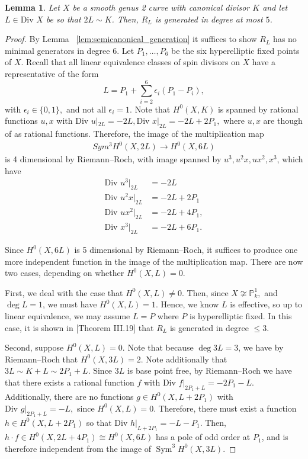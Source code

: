 \documentclass{amsart}
\theoremstyle{plain}
\newtheorem{lem}[thm]{Lemma}
\theoremstyle{definition}
\theoremstyle{remark}
\numberwithin{equation}{section}
\newcommand\BP{{\mathbb P}}
\newcommand \di{\text{Div }}
\DeclareMathOperator{\sym}{Sym}
\begin{document}
\begin{lem}
\label{lem:genus-2-generation-5}
Let $X$ be a smooth genus 2 curve with canonical divisor $K$ and let $L \in \di X$ be so that $2L \sim K$. 
Then, $R_L$ is generated in degree at most $5$.
\end{lem}
\begin{proof}
By Lemma ~\ref{lem:semicanonical_generation} it suffices to show $R_L$ has no minimal generators in degree 6.
Let $P_1, \ldots, P_6$ be the six hyperelliptic fixed points of $X$. 
Recall that all linear equivalence classes of spin divisors on $X$ have a representative of the form
$$L = P_1 + \sum_{i =2}^{6} \epsilon_i (P_1 - P_i),$$ 
with $\epsilon_i \in \{0,1\},$ and not all $\epsilon_i = 1$. 
Note that $H^0(X,K)$ is spanned by rational functions $u, x$ with $\di u|_{2L} = -2L, \di x|_{2L} = -2L + 2P_1,$ where $u,x$ are though of as rational functions. Therefore, the image of the multiplication map 
\begin{align*}
	Sym^3 H^0(X,2L) \rightarrow H^0(X,6L)
\end{align*}
is 4 dimensional by Riemann--Roch, with image spanned by $u^3,u^2x,ux^2, x^3$, 
which have 
\begin{align*}
	\di u^3|_{2L} &= -2L \\
	\di u^2x|_{2L} &= -2L + 2P_1 \\
	\di ux^2|_{2L} &= -2L+4P_1, \\
	\di x^3|_{2L} &= -2L + 6P_1.
\end{align*}

\noindent
Since $H^0(X,6L)$ is 5 dimensional by Riemann--Roch,
it suffices to produce one more independent function in the image of the multiplication map.
There are now two cases, depending on whether $H^0(X,L) = 0$.

First, we deal with the case that $H^0(X,L) \neq 0$. 
Then, since $X \not \cong \BP^1_k,$ and $\deg L = 1$, we must have $H^0(X,L) = 1$. Hence, we know $L$ is effective, so up to linear equivalence, we may assume $L = P$ where $P$ is hyperelliptic fixed. In this case, it is shown in \cite{neves:halfcan}[Theorem III.19] that $R_L$ is generated in degree $\leq 3$.

Second, suppose $H^0(X,L) = 0$.
Note that because $\deg 3L = 3$, we have by Riemann--Roch that $H^0(X,3L) = 2$. 
Note additionally that $3L \sim K + L \sim 2P_1 + L$. Since $3L$ is base point free, by Riemann--Roch
we have that there exists a rational function $f$ with $\di f|_{2P_1 + L} = -2P_1 - L.$ Additionally, there are no functions $g \in H^0(X,L + 2P_1)$ 
with $\di g|_{2P_1 + L} = -L,$ since $H^0(X,L) = 0.$ Therefore, there must 
exist a function $h \in H^0(X,L+2P_1)$ so that $\di h|_{L + 2P_1} = -L - P_1$.
Then, $h \cdot f \in H^0(X,2L + 4P_1) \cong H^0(X,6L)$ has a pole of odd 
order at $P_1$, and is therefore independent from the image of $\sym^3 H^0(X,3L)$.
\end{proof}
\end{document}
